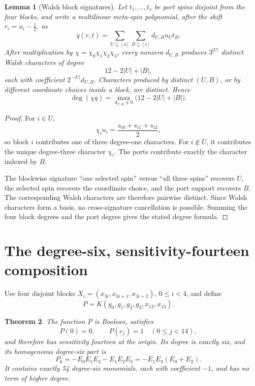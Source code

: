 \documentclass[11pt]{article}
\newtheorem{theorem}{Theorem}[section]
\newtheorem{lemma}[theorem]{Lemma}
\theoremstyle{definition}
\begin{document}
\begin{lemma}[Walsh block signatures]\label{lem:walsh-signature}
Let \(t_1,\ldots,t_s\) be port spins disjoint from the four blocks, and write a
multilinear meta-spin polynomial, after the shift \(r_i=u_i-\tfrac12\), as
\[
 q(r,t)=\sum_{U\subseteq[4]}\sum_{B\subseteq[s]}d_{U,B}u_Ut_B.
\]
After multiplication by \(\chi=\chi_0\chi_1\chi_2\chi_3\), every nonzero
\(d_{U,B}\) produces \(3^{|U|}\) distinct Walsh characters of degree
\[
 12-2|U|+|B|,
\]
each with coefficient \(2^{-|U|}d_{U,B}\).  Characters produced by distinct
\((U,B)\), or by different coordinate choices inside a block, are distinct.
Hence
\[
 \deg(\chi q)=\max_{d_{U,B}\ne0}\bigl(12-2|U|+|B|\bigr).
\]
\end{lemma}

\begin{proof}
For \(i\in U\),
\[
 \chi_i u_i=\frac{s_{i0}+s_{i1}+s_{i2}}2,
\]
so block \(i\) contributes one of three degree-one characters.  For
\(i\notin U\), it contributes the unique degree-three character \(\chi_i\).
The ports contribute exactly the character indexed by \(B\).

The blockwise signature ``one selected spin'' versus ``all three spins''
recovers \(U\), the selected spin recovers the coordinate choice, and the port
support recovers \(B\).  The corresponding Walsh characters are therefore
pairwise distinct.  Since Walsh characters form a basis, no cross-signature
cancellation is possible.  Summing the four block degrees and the port degree
gives the stated degree formula.
\end{proof}

\section{The degree-six, sensitivity-fourteen composition}

Use four disjoint blocks
\(X_i=(x_{3i},x_{3i+1},x_{3i+2})\), \(0\le i<4\), and define
\[
 P=K(g_0,g_1,g_2,g_3,x_{12},x_{13}).
\]

\begin{theorem}\label{thm:P}
The function \(P\) is Boolean, satisfies
\[
 P(0)=0,\qquad P(e_j)=1\quad(0\le j<14),
\]
and therefore has sensitivity fourteen at the origin.  Its degree is exactly
six, and its homogeneous degree-six part is
\[
 P_6=-E_0E_1E_3-E_1E_2E_3=-E_1E_3(E_0+E_2).
\]
It contains exactly 54 degree-six monomials, each with coefficient \(-1\), and
has no term of higher degree.
\end{theorem}
\end{document}
